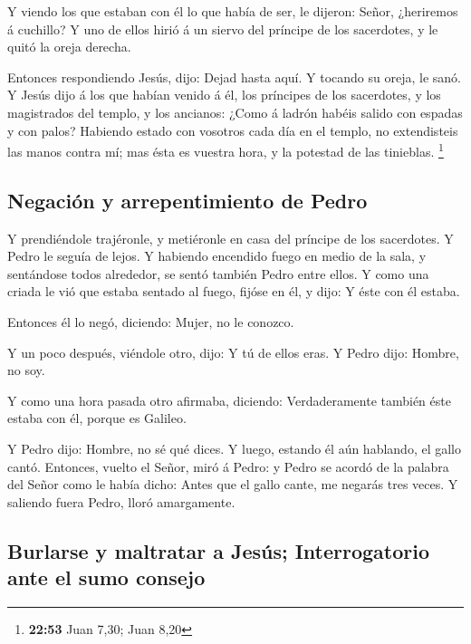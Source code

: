 Y viendo los que estaban con él lo que había de ser, le
dijeron: Señor, ¿heriremos á cuchillo?  Y uno de ellos
hirió á un siervo del príncipe de los sacerdotes, y le quitó la oreja
derecha.

 Entonces respondiendo Jesús, dijo: Dejad hasta aquí. Y
tocando su oreja, le sanó.  Y Jesús dijo á los que habían
venido á él, los príncipes de los sacerdotes, y los magistrados del
templo, y los ancianos: ¿Como á ladrón habéis salido con espadas y con
palos?  Habiendo estado con vosotros cada día en el templo,
no extendisteis las manos contra mí; mas ésta es vuestra hora, y la
potestad de las tinieblas. \footnote{\textbf{22:53} Juan 7,30; Juan 8,20}

\hypertarget{negaciuxf3n-y-arrepentimiento-de-pedro}{%
\subsection{Negación y arrepentimiento de
Pedro}\label{negaciuxf3n-y-arrepentimiento-de-pedro}}

 Y prendiéndole trajéronle, y metiéronle en casa del
príncipe de los sacerdotes. Y Pedro le seguía de lejos.  Y
habiendo encendido fuego en medio de la sala, y sentándose todos
alrededor, se sentó también Pedro entre ellos.  Y como una
criada le vió que estaba sentado al fuego, fijóse en él, y dijo: Y éste
con él estaba.

 Entonces él lo negó, diciendo: Mujer, no le conozco.

 Y un poco después, viéndole otro, dijo: Y tú de ellos
eras. Y Pedro dijo: Hombre, no soy.

 Y como una hora pasada otro afirmaba, diciendo:
Verdaderamente también éste estaba con él, porque es Galileo.

 Y Pedro dijo: Hombre, no sé qué dices. Y luego, estando él
aún hablando, el gallo cantó.  Entonces, vuelto el Señor,
miró á Pedro: y Pedro se acordó de la palabra del Señor como le había
dicho: Antes que el gallo cante, me negarás tres veces.  Y
saliendo fuera Pedro, lloró amargamente.

\hypertarget{burlarse-y-maltratar-a-jesuxfas-interrogatorio-ante-el-sumo-consejo}{%
\subsection{Burlarse y maltratar a Jesús; Interrogatorio ante el sumo
consejo}\label{burlarse-y-maltratar-a-jesuxfas-interrogatorio-ante-el-sumo-consejo}}

